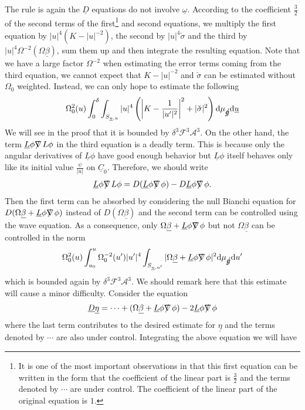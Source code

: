 \documentclass[11pt,reqno]{amsart}
\theoremstyle{definition}
\numberwithin{equation}{section}
\newcommand{\D}{\mathrm{d}}
\def\betab{\underline{\beta}}
\def\etab{\underline{\eta}}
\def\Lb{\underline{L}}
\def\omegab{\underline{\omega}}
\def\ub{\underline{u}}
\def\Cb{\underline{C}}
\newcommand{\Db}{\underline{D}}
\def\nablas{\mbox{$\nabla \mkern -13mu /$ }}
\def\gs{\mbox{$g \mkern -9mu /$}}
\begin{document}
The rule is again the $\Db$ equations do not involve $\omegab$. According to the coefficient $\frac{3}{2}$ of the second terms of the first\footnote{It is one of the most important observations in \cite{An-Luk} that this first equation can be written in the form that the coefficient of the linear part is $\frac{3}{2}$ and the terms denoted by $\cdots$ are under control. The coefficient of the linear part of the original equation is $1$.}  and second equations, we multiply the first equation by $|u|^4(K-|u|^{-2})$, the second by $|u|^4\check{\sigma}$ and the third by $|u|^4\Omega^{-2}(\Omega\betab)$, sum them up and then integrate the resulting equation. Note that we have a large factor $\Omega^{-2}$ when estimating the error terms coming from the third equation, we cannot expect that $K-|u|^{-2}$ and $\check{\sigma}$ can be estimated without $\Omega_0$ weighted. Instead, we can only hope to estimate the following
\begin{align*}
\Omega_0^2(u)\int_0^\delta\int_{S_{\ub,u}}|u|^4\left(\left|K-\frac{1}{|u'|^2}\right|^2+|\check{\sigma}|^2\right)\D\mu_{\gs}\D\ub
\end{align*}
We will see in the proof that it is bounded by $\delta^3\mathscr{F}^3\mathcal{A}^3$. On the other hand, the term $\Lb\phi\nablas L\phi$ in the third equation is a deadly term. This is because only the angular derivatives of $\Lb\phi$ have good enough behavior but $\Lb\phi$ itself behaves only like its initial value $\frac{\psi}{|u|}$ on $\Cb_0$. Therefore, we should write
\begin{align*}
\Lb\phi\nablas L\phi=D(\Lb\phi\nablas\phi)-D\Lb\phi\nablas\phi.
\end{align*}
Then the first term can be absorbed by considering the null Bianchi equation for $D(\Omega\betab+\Lb\phi\nablas\phi)$ instead of $D(\Omega\betab)$ and the second term can be controlled using the wave equation. As a consequence, only $\Omega\betab+\Lb\phi\nablas\phi$ but not $\Omega\betab$ can be controlled in the norm
\begin{align*}
\Omega_0^2(u)\int_{u_0}^u\Omega_0^{-2}(u')|u'|^4\int_{S_{\ub,u'}}|\Omega\betab+\Lb\phi\nablas\phi|^2\D\mu_{\gs}\D u'
\end{align*}
which is bounded again by $\delta^3\mathscr{F}^3\mathcal{A}^3$. We should remark here that this estimate will cause a minor difficulty. Consider the equation
\begin{align*}
\Db\etab=\cdots+(\Omega\betab+\Lb\phi\nablas\phi)-2\Lb\phi\nablas\phi
\end{align*}
where the last term contributes to the desired estimate for $\etab$ and the terms denoted by $\cdots$ are also under control. Integrating the above equation we will have
\end{document}
